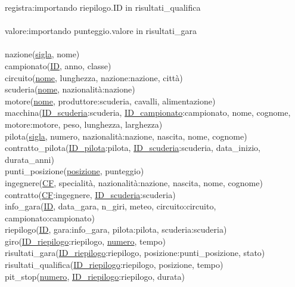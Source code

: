 \documentclass[a4paper,12pt]{report}
\begin{document}
			registra:\tab				importando riepilogo.ID in risultati\_qualifica\\\\
			valore:\tab					importando punteggio.valore in risultati\_gara\\\\
			nazione(\underline{sigla}, nome)\\
			campionato(\underline{ID}, anno, classe)\\
			circuito(\underline{nome}, lunghezza, nazione:nazione, città)\\
			scuderia(\underline{nome}, nazionalità:nazione)\\
			motore(\underline{nome}, produttore:scuderia, cavalli, alimentazione)\\
			macchina(\underline{ID\_scuderia}:scuderia, \underline{ID\_campionato}:campionato, nome, cognome,
			\tab\tab motore:motore, peso, lunghezza, larghezza)\\
			pilota(\underline{sigla}, numero, nazionalità:nazione, nascita, nome, cognome)\\
			contratto\_pilota(\underline{ID\_pilota}:pilota, \underline{ID\_scuderia}:scuderia, data\_inizio, durata\_anni)\\
			punti\_posizione(\underline{posizione}, punteggio)\\
			ingegnere(\underline{CF}, specialità, nazionalità:nazione, nascita, nome, cognome)\\
			contratto(\underline{CF}:ingegnere, \underline{ID\_scuderia}:scuderia)\\
			info\_gara(\underline{ID}, data\_gara, n\_giri, meteo, circuito:circuito, campionato:campionato)\\
			riepilogo(\underline{ID}, gara:info\_gara, pilota:pilota, scuderia:scuderia)\\
			giro(\underline{ID\_riepilogo}:riepilogo, \underline{numero}, tempo)\\
			risultati\_gara(\underline{ID\_riepilogo}:riepilogo, posizione:punti\_posizione, stato)\\
			risultati\_qualifica(\underline{ID\_riepilogo}:riepilogo, posizione, tempo)\\
			pit\_stop(\underline{numero}, \underline{ID\_riepilogo}:riepilogo, durata)\\
\end{document}
